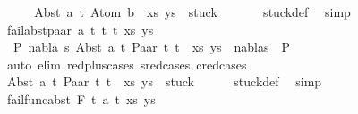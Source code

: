 \begin{isabellebody}
\ \ \isamarkupfalse%
\ \isamarkupfalse%
\ {\isachardoublequoteopen}{\isacharparenleft}{\kern0pt}{\isacharparenleft}{\kern0pt}Abst\ a\ t{\isacharcomma}{\kern0pt}\ Atom\ b{\isacharparenright}{\kern0pt}\ {\isacharhash}{\kern0pt}\ xs{\isacharcomma}{\kern0pt}\ ys{\isacharparenright}{\kern0pt}\ {\isasymin}\ stuck{\isachardoublequoteclose}\isanewline
\ \ \ \ \ \isamarkupfalse%
\ stuck{\isacharunderscore}{\kern0pt}def\ \isamarkupfalse%
\ simp\isanewline
{}\isamarkupfalse%
\isanewline
\ \ \isamarkupfalse%
\ {\isacharparenleft}{\kern0pt}fail{\isacharunderscore}{\kern0pt}abst{\isacharunderscore}{\kern0pt}paar\ a\ t\ t{}\ t{}\ xs\ ys{\isacharparenright}{\kern0pt}\isanewline
\ \ \isamarkupfalse%
\ {\isachardoublequoteopen}{\isasymnot}\ {\isacharparenleft}{\kern0pt}{\isasymexists}P{}\ nabla\ s{\isachardot}{\kern0pt}\ {\isacharparenleft}{\kern0pt}{\isacharparenleft}{\kern0pt}Abst\ a\ t{\isacharcomma}{\kern0pt}\ Paar\ t{}\ t{}{\isacharparenright}{\kern0pt}\ {\isacharhash}{\kern0pt}\ xs{\isacharcomma}{\kern0pt}\ ys{\isacharparenright}{\kern0pt}\ {\isasymTurnstile}\ {\isacharparenleft}{\kern0pt}nabla{\isacharcomma}{\kern0pt}s{\isacharparenright}{\kern0pt}\ {\isasymRightarrow}\ P{}{\isacharparenright}{\kern0pt}{\isachardoublequoteclose}\isanewline
\ \ \ \ \isamarkupfalse%
\ {\isacharparenleft}{\kern0pt}auto\ elim{\isacharcolon}{\kern0pt}\ red{\isacharunderscore}{\kern0pt}plus{\isachardot}{\kern0pt}cases\ s{\isacharunderscore}{\kern0pt}red{\isachardot}{\kern0pt}cases\ c{\isacharunderscore}{\kern0pt}red{\isachardot}{\kern0pt}cases{\isacharparenright}{\kern0pt}\isanewline
\ \ \isamarkupfalse%
\ \isamarkupfalse%
\ {\isachardoublequoteopen}{\isacharparenleft}{\kern0pt}{\isacharparenleft}{\kern0pt}Abst\ a\ t{\isacharcomma}{\kern0pt}\ Paar\ t{}\ t{}{\isacharparenright}{\kern0pt}\ {\isacharhash}{\kern0pt}\ xs{\isacharcomma}{\kern0pt}\ ys{\isacharparenright}{\kern0pt}\ {\isasymin}\ stuck{\isachardoublequoteclose}\isanewline
\ \ \ \ \isamarkupfalse%
\ stuck{\isacharunderscore}{\kern0pt}def\ \isamarkupfalse%
\ simp\isanewline
{}\isamarkupfalse%
\isanewline
\ \ \isamarkupfalse%
\ {\isacharparenleft}{\kern0pt}fail{\isacharunderscore}{\kern0pt}func{\isacharunderscore}{\kern0pt}abst\ F\ t{}\ a\ t\ xs\ ys{\isacharparenright}{\kern0pt}\isanewline

\end{isabellebody}
